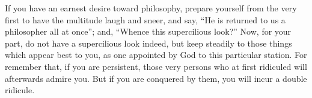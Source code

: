 If you have an earnest desire toward philosophy, prepare yourself from the very
first to have the multitude laugh and sneer,  and say, ``He is returned to us a
philosopher all  at once'';  and, ``Whence this  supercilious look?''  Now, for
your part, do not  have a supercilious look indeed, but  keep steadily to those
things which  appear best to  you, as one appointed  by God to  this particular
station. For  remember that, if you  are persistent, those very  persons who at
first ridiculed will  afterwards admire you. But if you  are conquered by them,
you will incur a double ridicule.
